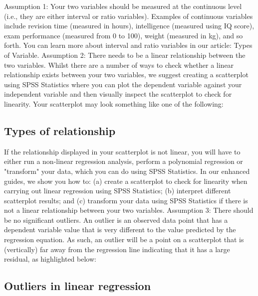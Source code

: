 \documentclass[]{article}
\begin{document}
	Assumption 1: Your two variables should be measured at the continuous level (i.e., they are either interval or ratio variables). Examples of continuous variables include revision time (measured in hours), intelligence (measured using IQ score), exam performance (measured from 0 to 100), weight (measured in kg), and so forth. You can learn more about interval and ratio variables in our article: Types of Variable.
	Assumption 2: There needs to be a linear relationship between the two variables. Whilst there are a number of ways to check whether a linear relationship exists between your two variables, we suggest creating a scatterplot using SPSS Statistics where you can plot the dependent variable against your independent variable and then visually inspect the scatterplot to check for linearity. Your scatterplot may look something like one of the following:
	
	\subsection*{Types of relationship}
	
	If the relationship displayed in your scatterplot is not linear, you will have to either run a non-linear regression analysis, perform a polynomial regression or "transform" your data, which you can do using SPSS Statistics. In our enhanced guides, we show you how to: (a) create a scatterplot to check for linearity when carrying out linear regression using SPSS Statistics; (b) interpret different scatterplot results; and (c) transform your data using SPSS Statistics if there is not a linear relationship between your two variables.
	Assumption 3: There should be no significant outliers. An outlier is an observed data point that has a dependent variable value that is very different to the value predicted by the regression equation. As such, an outlier will be a point on a scatterplot that is (vertically) far away from the regression line indicating that it has a large residual, as highlighted below:
	
	\subsection*{Outliers in linear regression}
	
\end{document}
